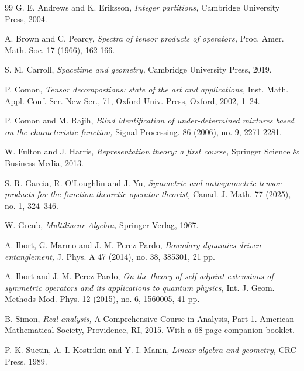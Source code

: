 \documentclass[11pt]{article}
\theoremstyle{plain}
\theoremstyle{definition}
\begin{document}
{\begin{thebibliography}{99}
G. E. Andrews and K. Eriksson, \emph{Integer partitions,}
 Cambridge University Press, 2004.
 
 A. Brown and C. Pearcy, \emph{Spectra of tensor products of operators,} Proc. Amer. Math. Soc. 17 (1966), 162-166.
 
 

S. M. Carroll, \emph{Spacetime and geometry,} Cambridge University Press, 2019.

P. Comon, \emph{Tensor decompostions: state of the art and applications,}  
Inst. Math. Appl. Conf. Ser. New Ser., 71, Oxford Univ. Press, Oxford, 2002, 1–24.

P. Comon and M. Rajih, \emph{Blind identification of under-determined mixtures based on the characteristic function,} Signal Processing. 86 (2006), no. 9, 2271-2281.


W. Fulton and J. Harris, \emph{Representation theory: a first course,} Springer Science \& Business Media, 2013.

S. R. Garcia, R. O'Loughlin and J. Yu, \emph{Symmetric and antisymmetric tensor products for the function-theoretic operator theorist,} Canad. J. Math. 77 (2025), no. 1, 324–346.


W. Greub, \emph{Multilinear Algebra,} Springer-Verlag, 1967.

A. Ibort, G. Marmo and J. M. Perez-Pardo, \emph{Boundary dynamics driven entanglement,} J. Phys. A 47 (2014), no. 38, 385301, 21 pp.

A. Ibort and J. M. Perez-Pardo, \emph{On the theory of self-adjoint extensions of symmetric operators and its applications to quantum physics,} Int. J. Geom. Methods Mod. Phys. 12 (2015), no. 6, 1560005, 41 pp.

B. Simon, \emph{Real analysis,} A Comprehensive Course in Analysis, Part 1. American Mathematical Society,
Providence, RI, 2015. With a 68 page companion booklet.

P. K. Suetin, A. I. Kostrikin and Y. I. Manin, \emph{Linear algebra and geometry,} CRC Press, 1989.



\end{thebibliography}}
\end{document}
